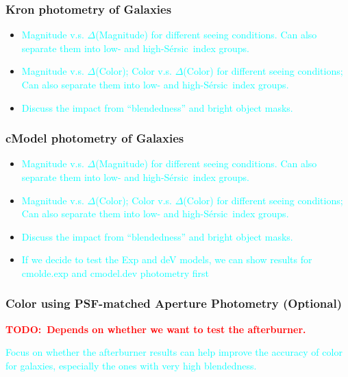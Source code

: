 \documentclass[preprint]{aastex}
\def\ser{{S\'{e}rsic\ }}
\newcommand{\todo}[1]{\textcolor{red}{\textbf{TODO:~#1}}}
\newcommand{\plan}[1]{\textcolor{cyan}{#1}}
\begin{document}
\subsubsection{Kron photometry of Galaxies}

    \begin{itemize}
        \item \plan{Magnitude v.s. $\Delta$(Magnitude) for different seeing conditions.
                    Can also separate them into low- and high-\ser index groups.}
        \item \plan{Magnitude v.s. $\Delta$(Color); Color v.s. $\Delta$(Color) for 
                    different seeing conditions; 
                    Can also separate them into low- and high-\ser index groups.}
        \item \plan{Discuss the impact from ``blendedness'' and bright object masks.}
    \end{itemize} 

\subsubsection{cModel photometry of Galaxies}

    \begin{itemize}
        \item \plan{Magnitude v.s. $\Delta$(Magnitude) for different seeing conditions.
                    Can also separate them into low- and high-\ser index groups.}
        \item \plan{Magnitude v.s. $\Delta$(Color); Color v.s. $\Delta$(Color) for 
                    different seeing conditions; 
                    Can also separate them into low- and high-\ser index groups.}
        \item \plan{Discuss the impact from ``blendedness'' and bright object masks.}
        \item \plan{If we decide to test the Exp and deV models, we can show results for 
                    cmolde.exp and cmodel.dev photometry first}
    \end{itemize} 

\subsubsection{Color using PSF-matched Aperture Photometry (Optional)}

    \todo{Depends on whether we want to test the afterburner.}
    
    \plan{Focus on whether the afterburner results can help improve the accuracy of 
          color for galaxies, especially the ones with very high blendedness.}
\end{document}
